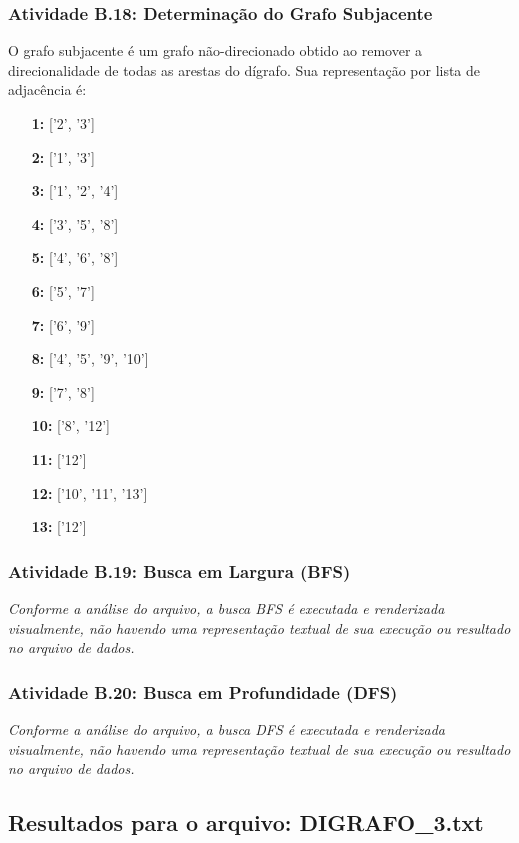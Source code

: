 \documentclass[a4paper,12pt]{article}
\begin{document}
\subsubsection*{Atividade B.18: Determinação do Grafo Subjacente}
O grafo subjacente é um grafo não-direcionado obtido ao remover a direcionalidade de todas as arestas do dígrafo. Sua representação por lista de adjacência é:
\begin{itemize}[leftmargin=*]
    \item[\textbf{1:}] ['2', '3']
    \item[\textbf{2:}] ['1', '3']
    \item[\textbf{3:}] ['1', '2', '4']
    \item[\textbf{4:}] ['3', '5', '8']
    \item[\textbf{5:}] ['4', '6', '8']
    \item[\textbf{6:}] ['5', '7']
    \item[\textbf{7:}] ['6', '9']
    \item[\textbf{8:}] ['4', '5', '9', '10']
    \item[\textbf{9:}] ['7', '8']
    \item[\textbf{10:}] ['8', '12']
    \item[\textbf{11:}] ['12']
    \item[\textbf{12:}] ['10', '11', '13']
    \item[\textbf{13:}] ['12']
\end{itemize}

\subsubsection*{Atividade B.19: Busca em Largura (BFS)}
\textit{Conforme a análise do arquivo, a busca BFS é executada e renderizada visualmente, não havendo uma representação textual de sua execução ou resultado no arquivo de dados.}

\subsubsection*{Atividade B.20: Busca em Profundidade (DFS)}
\textit{Conforme a análise do arquivo, a busca DFS é executada e renderizada visualmente, não havendo uma representação textual de sua execução ou resultado no arquivo de dados.}
\\

\subsection{Resultados para o arquivo: DIGRAFO\_3.txt}
\end{document}
